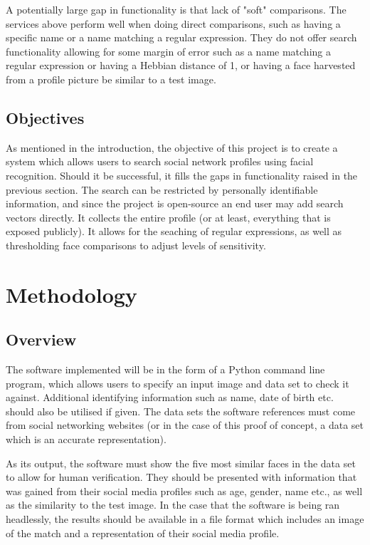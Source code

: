\documentclass[12pt]{article}
\begin{document}
A potentially large gap in functionality is that lack of "soft" comparisons. The services above perform well when doing direct comparisons, such as having a specific name or a name matching a regular expression. They do not offer search functionality allowing for some margin of error such as a name matching a regular expression or having a Hebbian distance of 1, or having a face harvested from a profile picture be similar to a test image.

\subsection{Objectives}
As mentioned in the introduction, the objective of this project is to create a system which allows users to search social network profiles using facial recognition. Should it be successful, it fills the gaps in functionality raised in the previous section. The search can be restricted by personally identifiable information, and since the project is open-source an end user may add search vectors directly. It collects the entire profile (or at least, everything that is exposed publicly). It allows for the seaching of regular expressions, as well as thresholding face comparisons to adjust levels of sensitivity.

\newpage
\section{Methodology}
\subsection{Overview}
The software implemented will be in the form of a Python command line program, which allows users to specify an input image and data set to check it against. Additional identifying information such as name, date of birth etc. should also be utilised if given. The data sets the software references must come from social networking websites (or in the case of this proof of concept, a data set which is an accurate representation).

As its output, the software must show the five most similar faces in the data set to allow for human verification. They should be presented with information that was gained from their social media profiles such as age, gender, name etc., as well as the similarity to the test image. In the case that the software is being ran headlessly, the results should be available in a file format which includes an image of the match and a representation of their social media profile.
\end{document}
